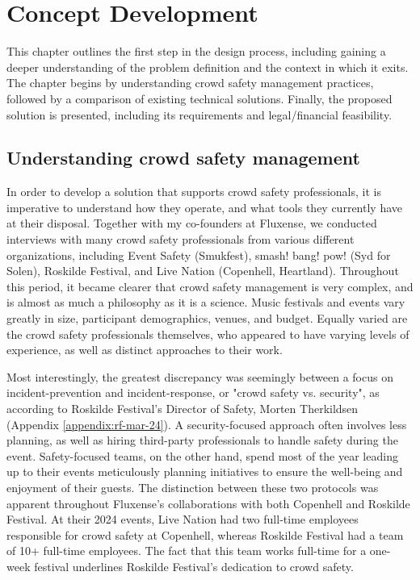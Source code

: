 \chapter{Concept Development}
\label{chap:concept-development}

This chapter outlines the first step in the design process, including gaining a deeper understanding of the problem definition and the context in which it exits. The chapter begins by understanding crowd safety management practices, followed by a comparison of existing technical solutions. Finally, the proposed solution is presented, including its requirements and legal/financial feasibility.


\section{Understanding crowd safety management}
\label{sec:crowd-safety}

In order to develop a solution that supports crowd safety professionals, it is imperative to understand how they operate, and what tools they currently have at their disposal. Together with my co-founders at Fluxense, we conducted interviews with many crowd safety professionals from various different organizations, including Event Safety (Smukfest), smash! bang! pow! (Syd for Solen), Roskilde Festival, and Live Nation (Copenhell, Heartland). Throughout this period, it became clearer that crowd safety management is very complex, and is almost as much a philosophy as it is a science. Music festivals and events vary greatly in size, participant demographics, venues, and budget. Equally varied are the crowd safety professionals themselves, who appeared to have varying levels of experience, as well as distinct approaches to their work.

Most interestingly, the greatest discrepancy was seemingly between a focus on incident-prevention and incident-response, or "crowd safety vs. security", as according to Roskilde Festival's Director of Safety, Morten Therkildsen (Appendix \ref{appendix:rf-mar-24}). A security-focused approach often involves less planning, as well as hiring third-party professionals to handle safety during the event. Safety-focused teams, on the other hand, spend most of the year leading up to their events meticulously planning initiatives to ensure the well-being and enjoyment of their guests. The distinction between these two protocols was apparent throughout Fluxense's collaborations with both Copenhell and Roskilde Festival. At their 2024 events, Live Nation had two full-time employees responsible for crowd safety at Copenhell, whereas Roskilde Festival had a team of 10+ full-time employees. The fact that this team works full-time for a one-week festival underlines Roskilde Festival's dedication to crowd safety.

